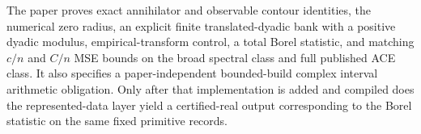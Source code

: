 The paper proves exact annihilator and observable contour identities, the numerical zero radius, an explicit finite translated-dyadic bank with a positive dyadic modulus, empirical-transform control, a total Borel statistic, and matching \(c/n\) and \(C/n\) MSE bounds on the broad spectral class and full published ACE class. It also specifies a paper-independent bounded-build complex interval arithmetic obligation. Only after that implementation is added and compiled does the represented-data layer yield a certified-real output corresponding to the Borel statistic on the same fixed primitive records.